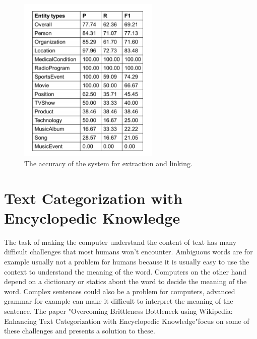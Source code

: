 \documentclass[english,a4paper]{ifimaster}
\begin{document}


\begin{figure}[H]
\centering
\includegraphics[height=8cm]{Classification_entities}
\caption{The accuracy of the system for extraction and linking.}
\label{fig:classification_entities}
\end{figure}


\chapter{Text Categorization with Encyclopedic Knowledge}
The task of making the computer understand the content of text has many difficult challenges that most humans won't encounter. Ambiguous words are for example usually not a problem for humans because it is usually easy to use the context to understand the meaning of the word. Computers on the other hand depend on a dictionary or statics about the word to decide the meaning of the word. Complex sentences could also be a problem for computers, advanced grammar for example can make it difficult to interpret the meaning of the sentence. The paper "Overcoming Brittleness Bottleneck using Wikipedia: Enhancing Text Categorization with Encyclopedic Knowledge"\cite{brittleness}focus on some of these challenges and presents a solution to these. 
\end{document}
